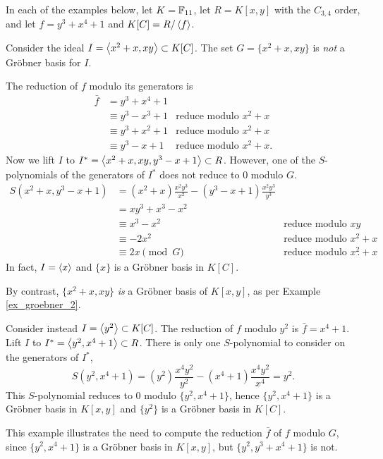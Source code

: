 In each of the examples below,
let $K = \mathbb{F}_{11}$,
let $R = K[x,y]$ with the $C_{3,4}$ order,
and let $f = y^3 + x^4 + 1$ and $K[C] = R/\left\langle f \right\rangle$.
\begin{example}
  Consider the ideal $I = \left\langle x^2 + x, xy \right\rangle \subset K[C]$.
  The set $G = \{ x^2 + x, xy \}$ is \emph{not} a Gr\"obner basis for $I$.
  
  The reduction of $f$ modulo its generators is
  \begin{align*}
    \bar f  &= y^3 + x^4 + 1 \\
            &\equiv y^3 - x^3 + 1 & \text{reduce modulo $x^2 + x$} \\
            &\equiv y^3 + x^2 + 1 & \text{reduce modulo $x^2 + x$} \\
            &\equiv y^3 - x + 1 & \text{reduce modulo $x^2 + x$}.
  \end{align*}
  Now we lift $I$ to $I^* = \left\langle x^2 + x, xy, y^3 - x + 1 \right\rangle \subset R$.
  However, one of the $S$-polynomials of the generators of $I^*$ does not reduce to 0 modulo $G$.
  \begin{align*}
    S(x^2 + x, y^3 - x + 1)
      &= (x^2 + x)\frac{x^2y^3}{x^2} - (y^3 - x + 1)\frac{x^2y^3}{y^3} \\
      &= xy^3 + x^3 - x^2 \\
      &\equiv x^3 - x^2 & \text{reduce modulo $xy$} \\
      &\equiv -2x^2 & \text{reduce modulo $x^2 + x$} \\
      &\equiv 2x \pmod G & \text{reduce modulo $x^2 + x$}.
  \end{align*}
  In fact, $I = \left\langle x \right\rangle$ and $\{x\}$ is a Gr\"obner basis in $K[C]$.

  By contrast, $\{x^2 + x, xy\}$ \emph{is} a Gr\"obner basis of $K[x,y]$,
  as per Example \ref{ex_groebner_2}.
\end{example}
\begin{example}
  Consider instead $I = \left\langle y^2 \right\rangle \subset K[C]$.
  The reduction of $f$ modulo $y^2$ is $\bar f = x^4 + 1$.
  Lift $I$ to $I^* = \left\langle y^2, x^4 + 1 \right\rangle \subset R$.
  There is only one $S$-polynomial to consider on the generators of $I^*$,
  \[ S(y^2, x^4 + 1) = (y^2) \frac{x^4y^2}{y^2} - (x^4 + 1)\frac{x^4y^2}{x^4} = y^2. \]
  This $S$-polynomial reduces to 0 modulo $\{y^2, x^4 + 1\}$,
  hence $\{y^2, x^4 + 1\}$ is a Gr\"obner basis in $K[x,y]$ and $\{y^2\}$ is a Gr\"obner basis in $K[C]$.
  
  This example illustrates the need to compute the reduction $\bar f$ of $f$ modulo $G$,
  since $\{y^2, x^4 + 1\}$ is a Gr\"obner basis in $K[x,y]$, but $\{y^2, y^3 + x^4 + 1\}$ is not.
\end{example}
